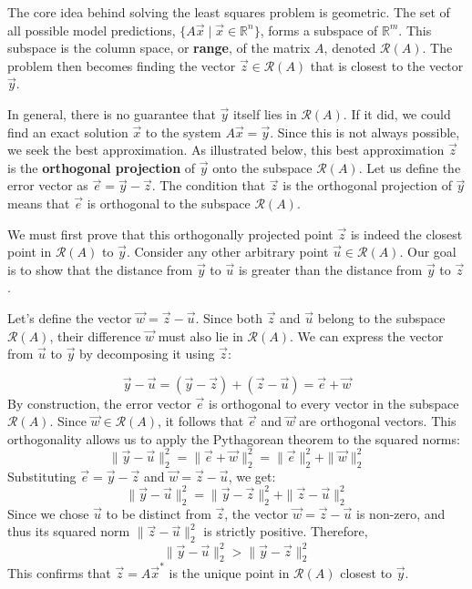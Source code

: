 \documentclass{article}
\begin{document}
\begin{Proof}
  \begin{Exposition}
    The core idea behind solving the least squares problem is geometric. The set of all possible model predictions, $\{A\vec{x} \mid \vec{x} \in \mathbb{R}^n\}$, forms a subspace of $\mathbb{R}^m$. This subspace is the column space, or \textbf{range}, of the matrix $A$, denoted $\mathcal{R}(A)$. The problem then becomes finding the vector $\vec{z} \in \mathcal{R}(A)$ that is closest to the vector $\vec{y}$.

    In general, there is no guarantee that $\vec{y}$ itself lies in $\mathcal{R}(A)$. If it did, we could find an exact solution $\vec{x}$ to the system $A\vec{x} = \vec{y}$. Since this is not always possible, we seek the best approximation. As illustrated below, this best approximation $\vec{z}$ is the \textbf{orthogonal projection} of $\vec{y}$ onto the subspace $\mathcal{R}(A)$. Let us define the error vector as $\vec{e} = \vec{y} - \vec{z}$. The condition that $\vec{z}$ is the orthogonal projection of $\vec{y}$ means that $\vec{e}$ is orthogonal to the subspace $\mathcal{R}(A)$.

    We must first prove that this orthogonally projected point $\vec{z}$ is indeed the closest point in $\mathcal{R}(A)$ to $\vec{y}$. Consider any other arbitrary point $\vec{u} \in \mathcal{R}(A)$. Our goal is to show that the distance from $\vec{y}$ to $\vec{u}$ is greater than the distance from $\vec{y}$ to $\vec{z}$.

    Let's define the vector $\vec{w} = \vec{z} - \vec{u}$. Since both $\vec{z}$ and $\vec{u}$ belong to the subspace $\mathcal{R}(A)$, their difference $\vec{w}$ must also lie in $\mathcal{R}(A)$. We can express the vector from $\vec{u}$ to $\vec{y}$ by decomposing it using $\vec{z}$:

    $$ \vec{y} - \vec{u} = (\vec{y} - \vec{z}) + (\vec{z} - \vec{u}) = \vec{e} + \vec{w} $$
    By construction, the error vector $\vec{e}$ is orthogonal to every vector in the subspace $\mathcal{R}(A)$. Since $\vec{w} \in \mathcal{R}(A)$, it follows that $\vec{e}$ and $\vec{w}$ are orthogonal vectors.
    This orthogonality allows us to apply the Pythagorean theorem to the squared norms:
    $$ \|\vec{y} - \vec{u}\|_2^2 = \|\vec{e} + \vec{w}\|_2^2 = \|\vec{e}\|_2^2 + \|\vec{w}\|_2^2 $$
    Substituting $\vec{e} = \vec{y} - \vec{z}$ and $\vec{w} = \vec{z} - \vec{u}$, we get:
    $$ \|\vec{y} - \vec{u}\|_2^2 = \|\vec{y} - \vec{z}\|_2^2 + \|\vec{z} - \vec{u}\|_2^2 $$
    Since we chose $\vec{u}$ to be distinct from $\vec{z}$, the vector $\vec{w} = \vec{z} - \vec{u}$ is non-zero, and thus its squared norm $\|\vec{z} - \vec{u}\|_2^2$ is strictly positive. Therefore,
    $$ \|\vec{y} - \vec{u}\|_2^2 > \|\vec{y} - \vec{z}\|_2^2 $$
    This confirms that $\vec{z} = A\vec{x}^*$ is the unique point in $\mathcal{R}(A)$ closest to $\vec{y}$.


\end{Exposition}
\end{Proof}
\end{document}
